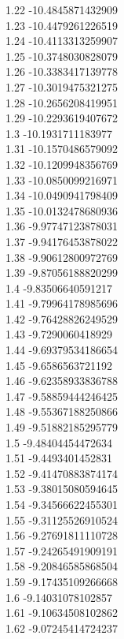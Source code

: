 {1.22	-10.4845871432909\\
1.23	-10.4479261226519\\
1.24	-10.4113313259907\\
1.25	-10.3748030828079\\
1.26	-10.3383417139778\\
1.27	-10.3019475321275\\
1.28	-10.2656208419951\\
1.29	-10.2293619407672\\
1.3	-10.1931711183977\\
1.31	-10.1570486579092\\
1.32	-10.1209948356769\\
1.33	-10.0850099216971\\
1.34	-10.0490941798409\\
1.35	-10.0132478680936\\
1.36	-9.97747123878031\\
1.37	-9.94176453878022\\
1.38	-9.90612800972769\\
1.39	-9.87056188820299\\
1.4	-9.83506640591217\\
1.41	-9.79964178985696\\
1.42	-9.76428826249529\\
1.43	-9.7290060418929\\
1.44	-9.69379534186654\\
1.45	-9.6586563721192\\
1.46	-9.62358933836788\\
1.47	-9.58859444246425\\
1.48	-9.55367188250866\\
1.49	-9.51882185295779\\
1.5	-9.48404454472634\\
1.51	-9.4493401452831\\
1.52	-9.41470883874174\\
1.53	-9.38015080594645\\
1.54	-9.34566622455301\\
1.55	-9.31125526910524\\
1.56	-9.27691811110728\\
1.57	-9.24265491909191\\
1.58	-9.20846585868504\\
1.59	-9.17435109266668\\
1.6	-9.14031078102857\\
1.61	-9.10634508102862\\
1.62	-9.07245414724237\\
}

